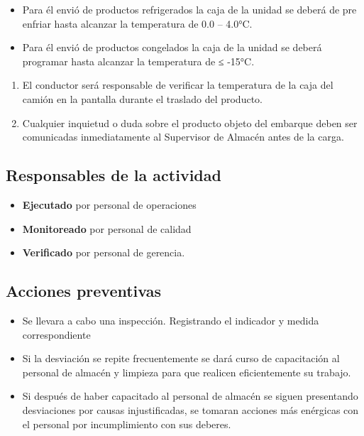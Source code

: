 \begin{itemize}
	\item Para él envió de productos refrigerados la caja de la unidad se deberá de pre enfriar hasta alcanzar la temperatura de 0.0 – 4.0°C.
	\item Para él envió de productos congelados la caja de la unidad se deberá programar hasta alcanzar la temperatura de ≤ -15°C.
\end{itemize}

\begin{enumerate}
	\item El conductor será responsable de verificar la temperatura de la caja del camión en la pantalla durante el traslado del producto.
	\item Cualquier inquietud o duda sobre el producto objeto del embarque deben ser comunicadas inmediatamente al Supervisor de Almacén antes de la carga.
\end{enumerate}

\subsection{Responsables de la actividad}

\begin{itemize}
	\item \textbf{Ejecutado} por personal de operaciones
	\item \textbf{Monitoreado} por personal de calidad
	\item \textbf{Verificado} por personal de gerencia.
\end{itemize}

\subsection{Acciones preventivas}

\begin{itemize}
	\item Se llevara a cabo una inspección. Registrando el indicador y medida correspondiente
	\item Si la desviación se repite frecuentemente se dará curso de capacitación al personal de almacén y limpieza para que realicen eficientemente su trabajo.
	\item Si después de haber capacitado al personal de almacén se siguen presentando desviaciones por causas injustificadas, se tomaran acciones más enérgicas con el personal por incumplimiento con sus deberes.
\end{itemize}

